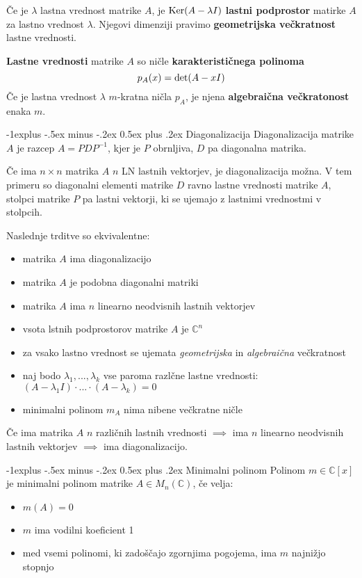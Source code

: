 \documentclass[a4paper,8pt]{extarticle}
\makeatletter
\renewcommand{\subsection}{\@startsection{subsection}{2}{0mm}%
                                {-1explus -.5ex minus -.2ex}%
                                {0.5ex plus .2ex}%
                                {\normalfont\normalsize\bfseries}}
\makeatother
\begin{document}
\begin{multicols}{3}
Če je $\lambda$ lastna vrednost matrike $A$, je $\textmd{Ker}(A-\lambda I)$ \textbf{lastni podprostor} matirke $A$ za lastno vrednost $\lambda$.
Njegovi dimenziji pravimo \textbf{geometrijska večkratnost} lastne vrednosti.

\textbf{Lastne vrednosti} matrike $A$ so ničle \textbf{karakterističnega polinoma} 
\[p_A(x) = \textmd{det}(A-xI)\]
Če je lastna vrednost $\lambda$ $m$-kratna ničla $p_A$, je njena \textbf{algebraična večkratonost} enaka $m$.

\subsection{Diagonalizacija}
Diagonalizacija matrike $A$ je razcep $A = PDP^{-1}$, kjer je $P$ obrnljiva, $D$ pa diagonalna matrika.

Če ima $n \times n$ matrika $A$ $n$ LN lastnih vektorjev, je diagonalizacija možna. V tem primeru so diagonalni elementi matrike $D$ ravno lastne vrednosti matrike $A$, stolpci matrike $P$ pa lastni vektorji, ki se ujemajo z lastnimi vrednostmi v stolpcih.

Naslednje trditve so ekvivalentne:
\begin{itemize}
    \item matrika $A$ ima diagonalizacijo
    \item matrika $A$ je podobna diagonalni matriki
    \item matrika $A$ ima $n$ linearno neodvisnih lastnih vektorjev
    \item vsota lstnih podprostorov matrike $A$ je $\mathbb{C}^n$
    \item za vsako lastno vrednost se ujemata \emph{geometrijska} in \emph{algebraična} večkratnost
    \item naj bodo $\lambda_1,..., \lambda_k$ vse paroma razlčne lastne vrednosti: $(A-\lambda_1 I)\cdot ... \cdot (A-\lambda_k) = 0$
    \item minimalni polinom $m_A$ nima nibene večkratne ničle
\end{itemize}

Če ima matrika $A$ $n$ različnih lastnih vrednosti $\implies$ ima $n$ linearno neodvisnih lastnih vektorjev $\implies$ ima diagonalizacijo.

\subsection{Minimalni polinom}
Polinom $m \in \mathbb{C}[x]$ je minimalni polinom matrike $A \in M_n(\mathbb{C})$, če velja:
\begin{itemize}
    \item $m(A) = 0$
    \item $m$ ima vodilni koeficient 1
    \item med vsemi polinomi, ki zadoščajo zgornjima pogojema, ima $m$ najnižjo stopnjo
\end{itemize}


\end{multicols}
\end{document}
